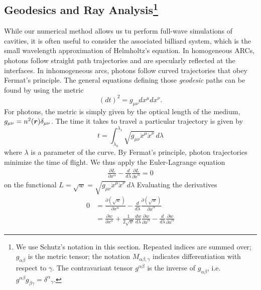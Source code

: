 \subsection{Geodesics and Ray Analysis\footnote{We use Schutz's \cite{SCH2009} notation in this section.
Repeated indices are summed over; $g_{\alpha\beta}$ is the metric tensor; the notation 
$M_{\alpha\beta,\gamma}$ indicates differentiation with respect to $\gamma$. The contravariant
tensor $g^{\alpha\beta}$ is the inverse of $g_{\alpha\beta}$, i.e. $g^{\alpha\beta}g_{\beta\gamma}={\delta^\alpha}_\gamma$.}}
While our numerical method allows us tu perform full-wave
simulations of cavities, it is often useful to consider the associated
billiard system, which is the small wavelength approximation of 
Helmholtz's equation. In homogeneous ARCs, photons follow straight path
trajectories and are specularly reflected at the interfaces. In inhomogeneous
\glspl{arc}, photons follow curved trajectories that obey Fermat's principle. 
The general equations defining those \textit{geodesic} paths can be found
by using the metric
  \begin{equation}
   (dt)^2=g_{\mu\nu}dx^\mu dx^\nu. 
  \end{equation}
For photons, the metric is simply given by the optical length 
of the medium, $g_{\mu\nu}=n^2(\boldsymbol{r})\delta_{\mu\nu}$. 
The time it takes to travel a particular trajectory is given by
  \begin{equation}
   t = \int_{\lambda_0}^{\lambda_1} \sqrt{g_{\mu\nu}\dot{x}^\mu\dot{x}^\nu}\,d\lambda
  \end{equation}
where $\lambda$ is a parameter of the curve. By Fermat's principle, photon 
trajectories minimize the time of flight. We thus apply the Euler-Lagrange
equation 
  \begin{align}
   \frac{\partial L}{\partial x^\alpha}-\frac{d}{d\lambda}\frac{\partial L}{\partial\dot{x}^\alpha}=0
  \end{align}
on the functional $L=\sqrt{w}=\sqrt{g_{\mu\nu}\dot{x}^\mu\dot{x}^\nu}\,d\lambda$ Evaluating the derivatives
  \begin{align*}
  0	&=\frac{\partial\left(\sqrt{w}\right)}{\partial x^\alpha}-\frac{d}{d\lambda}\frac{\partial\left(\sqrt{w}\right)}{\partial\dot{x}^\alpha}	\\
  {}	&=\frac{\partial w}{\partial x^\alpha}+\frac{1}{2\sqrt{w}}\frac{dw}{d\lambda}\frac{\partial w}{\partial\dot{x}^\alpha}-\frac{d}{d\lambda}\frac{\partial w}{\partial\dot{x}^\alpha}
  \end{align*}
